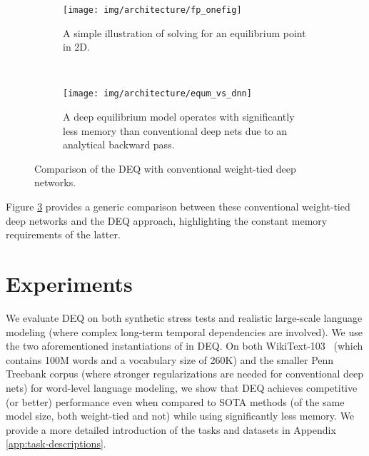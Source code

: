\documentclass{article}
\begin{document}
\begin{figure}[t]
  \centering
  \begin{subfigure}[b]{0.355\textwidth}
    \texttt{[image: img/architecture/fp\_onefig]}
    \caption{A simple illustration of solving for an equilibrium point in 2D.}
    \label{fig:iterations}
  \end{subfigure}
  ~
  \begin{subfigure}[b]{0.627\textwidth}
    \texttt{[image: img/architecture/equm\_vs\_dnn]}
    \caption{A deep equilibrium model operates with significantly less memory than conventional deep nets due to an analytical backward pass.}
    \label{fig:equm_vs_dnn}
  \end{subfigure}
  \caption{Comparison of the DEQ with conventional weight-tied deep networks.}
  \label{fig:comparisons}
  \vspace{-5mm}
\end{figure}

Figure \ref{fig:comparisons} provides a generic comparison between these conventional weight-tied deep networks and the DEQ approach, highlighting the constant memory requirements of the latter.


\section{Experiments}
\label{sec:experiments}

We evaluate DEQ on both synthetic stress tests and realistic large-scale language modeling (where complex long-term temporal dependencies are involved). We use the two aforementioned instantiations of  in DEQ. On both WikiText-103~\cite{merity2016pointer} (which contains 100M words and a vocabulary size of 260K) and the smaller Penn Treebank corpus (where stronger regularizations are needed for conventional deep nets) for word-level language modeling, we show that DEQ achieves competitive (or better) performance even when compared to SOTA methods (of the same model size, both weight-tied and not) while using significantly less memory. We provide a more detailed introduction of the tasks and datasets in Appendix \ref{app:task-descriptions}.

\vspace{-2mm}
\end{document}
